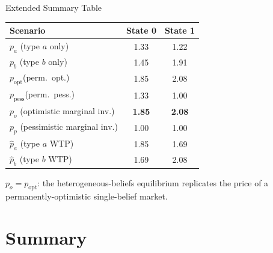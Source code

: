 \documentclass[aspectratio=169]{beamer}
\newcommand{\pha}{\hat{p}_a}
\newcommand{\phb}{\hat{p}_b}
\begin{document}
\begin{frame}{Extended Summary Table}
  \begin{center}
  \renewcommand{\arraystretch}{1.4}
  \begin{tabular}{lcc}
    \toprule
    \textbf{Scenario} & \textbf{State 0} & \textbf{State 1} \\
    \midrule
    $p_a$ \;(type $a$ only)         & 1.33 & 1.22 \\
    $p_b$ \;(type $b$ only)         & 1.45 & 1.91 \\
    $p_{\mathrm{opt}}$\;(perm.\ opt.)   & 1.85 & 2.08 \\
    $p_{\mathrm{pess}}$\;(perm.\ pess.) & 1.33 & 1.00 \\
    \midrule
    $p_o$ \;(optimistic marginal inv.)  & \textbf{1.85} & \textbf{2.08} \\
    $p_p$ \;(pessimistic marginal inv.) & 1.00 & 1.00 \\
    \midrule
    $\pha$ \;(type $a$ WTP)             & 1.85 & 1.69 \\
    $\phb$ \;(type $b$ WTP)             & 1.69 & 2.08 \\
    \bottomrule
  \end{tabular}
  \end{center}

  \smallskip
  \footnotesize $p_o = p_{\mathrm{opt}}$: the heterogeneous-beliefs equilibrium
  replicates the price of a permanently-optimistic single-belief market.
\end{frame}

\section{Summary}
\end{document}

